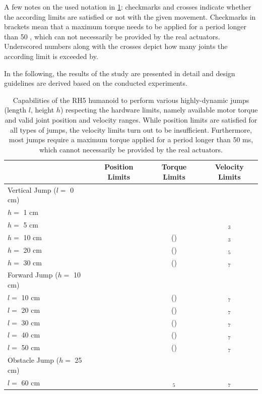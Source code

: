 A few notes on the used notation in \cref{tab:systemLimits}: checkmarks and crosses indicate whether the according limits are satisfied or not with the given movement. Checkmarks in brackets mean that a maximum torque needs to be applied for a period longer than 50 , which can not necessarily be provided by the real actuators. Underscored numbers along with the crosses depict how many joints the according limit is exceeded by.

In the following, the results of the study are presented in detail and design guidelines are derived based on the conducted experiments. 

\begin{table}[t]
\centering
\caption[Capabilities of the RH5 humanoid to perform highly-dynamic jumps]{Capabilities of the RH5 humanoid to perform various highly-dynamic jumps (length $l$, height $h$) respecting the hardware limits, namely available motor torque and valid joint position and velocity ranges. While position limits are satisfied for all types of jumps, the velocity limits turn out to be insufficient. Furthermore, most jumps require a maximum torque applied for a period longer than 50 ms, which cannot necessarily be provided by the real actuators.}
\begin{tabular}{lccc}
\hline
& Position Limits & Torque Limits & Velocity Limits\\ \hline
Vertical Jump ($l=$ 0 cm) & & & \\
\quad\quad $h=$ 1 cm 		& \greencheckmark  & \greencheckmark & \greencheckmark \\
\quad\quad $h=$ 5 cm 		& \greencheckmark  & \greencheckmark & \redxmark$_3$ \\
\quad\quad $h=$ 10 cm 		& \greencheckmark & (\greencheckmark) & \redxmark$_3$  \\
\quad\quad $h=$ 20 cm 		& \greencheckmark  & (\greencheckmark) & \redxmark$_5$ \\
\quad\quad $h=$ 30 cm 		& \greencheckmark  & (\greencheckmark) & \redxmark$_7$ \\ \hline
Forward Jump ($h=$ 10 cm)& & & \\
\quad\quad $l=$ 10 cm 		& \greencheckmark  & (\greencheckmark) & \redxmark$_7$ \\
\quad\quad $l=$ 20 cm 		& \greencheckmark  & (\greencheckmark) & \redxmark$_7$ \\
\quad\quad $l=$ 30 cm 		& \greencheckmark  & (\greencheckmark) & \redxmark$_7$ \\
\quad\quad $l=$ 40 cm 		& \greencheckmark  & (\greencheckmark) & \redxmark$_7$ \\
\quad\quad $l=$ 50 cm 		& \greencheckmark  & (\greencheckmark) & \redxmark$_7$ \\ \hline
Obstacle Jump ($h=$ 25 cm)& & & \\
\quad\quad $l=$ 60 cm 		& \greencheckmark  & \redxmark$_5$ & \redxmark$_7$ \\ \hline
\end{tabular}
\label{tab:systemLimits}
\end{table}

